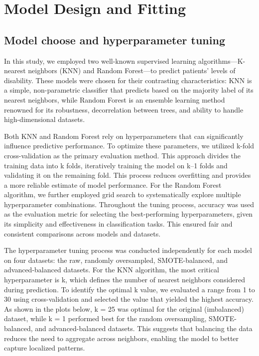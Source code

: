 \section{Model Design and Fitting}

\subsection{Model choose and hyperparameter tuning}

In this study, we employed two well-known supervised learning algorithms—K-nearest neighbors (KNN) and 
Random Forest—to predict patients' levels of disability. These models were chosen for their contrasting characteristics:
KNN is a simple, non-parametric classifier that predicts based on the majority label of its nearest neighbors, 
while Random Forest is an ensemble learning method renowned for its robustness, decorrelation between trees, 
and ability to handle high-dimensional datasets. 

Both KNN and Random Forest rely on hyperparameters that can significantly influence predictive performance.
To optimize these parameters, we utilized k-fold cross-validation as the primary evaluation method. 
This approach divides the training data into k folds, iteratively training the model on k–1 
folds and validating it on the remaining fold. This process reduces overfitting and provides
a more reliable estimate of model performance. For the Random Forest algorithm,
we further employed grid search to systematically explore multiple hyperparameter combinations.
Throughout the tuning process, accuracy was used as the evaluation metric for selecting the best-performing hyperparameters,
given its simplicity and effectiveness in classification tasks. This ensured fair and consistent comparisons across models and datasets.

The hyperparameter tuning process was conducted independently for each model on four datasets: the raw,
randomly oversampled, SMOTE-balanced, and advanced-balanced datasets. 
For the KNN algorithm, the most critical hyperparameter is k, which defines the number of nearest
neighbors considered during prediction. To identify the optimal k value, we evaluated a range from
1 to 30 using cross-validation and selected the value that yielded the highest accuracy.
As shown in the plots below, k = 25 was optimal for the original (imbalanced) dataset, while k = 1 performed
best for the random oversampling, SMOTE-balanced, and advanced-balanced datasets.
This suggests that balancing the data reduces the need to aggregate across neighbors,
    enabling the model to better capture localized patterns.


